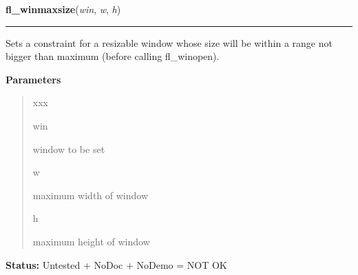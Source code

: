 \hspace{.8\funcindent}\begin{boxedminipage}{\funcwidth}

    \raggedright \textbf{fl\_winmaxsize}(\textit{win}, \textit{w}, \textit{h})

    \vspace{-1.5ex}

    \rule{\textwidth}{0.5\fboxrule}
\setlength{\parskip}{2ex}
    Sets a constraint for a resizable window whose size will be within a 
    range not bigger than maximum (before calling fl\_winopen).

\setlength{\parskip}{1ex}
      \textbf{Parameters}
      \vspace{-1ex}

      \begin{quote}
        \begin{Ventry}{xxx}

          \item[win]

          window to be set

          \item[w]

          maximum width of window

          \item[h]

          maximum height of window

        \end{Ventry}

      \end{quote}

\textbf{Status:} Untested + NoDoc + NoDemo = NOT OK



    \end{boxedminipage}

    \label{xformslib:library:fl_winaspect}

    \vspace{0.5ex}

